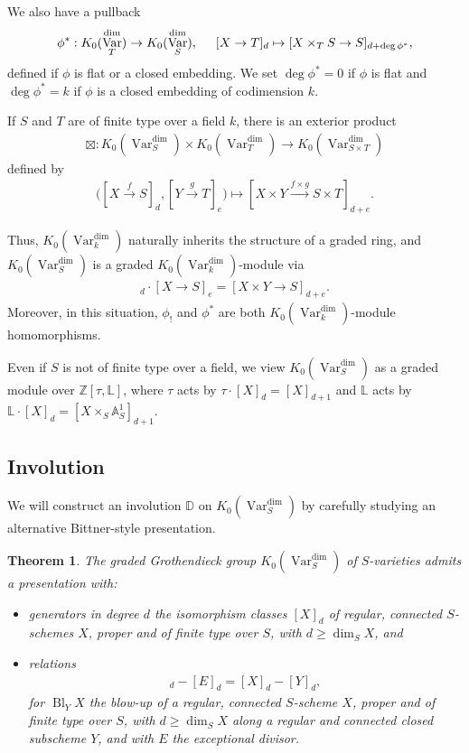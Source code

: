 \documentclass{amsart}
\newtheorem{thm}{Theorem}[section]
\theoremstyle{definition}
\DeclareMathOperator{\Var}{Var}
\DeclareMathOperator{\Bl}{Bl}
\newcommand{\Kdim}{K_0(\Var_k^{\dim})}
\newcommand{\KdimS}{K_0(\Var_S^{\dim})}
\numberwithin{equation}{section}
\begin{document}
We also have a pullback
\begin{align*}
    \phi^*: K_0(\Var_T^{\dim}) \rightarrow K_0(\Var_S^{\dim}), \hspace{.5cm} [X \rightarrow T]_d \mapsto [X \times_T S \rightarrow S]_{d + \deg \phi^*},
\end{align*}
defined if $\phi$ is flat or a closed embedding. We set $\deg \phi^* = 0$ if $\phi$ is flat and $\deg \phi^* = k$ if $\phi$ is a closed embedding of codimension $k$.

If $S$ and $T$ are of finite type over a field $k$, there is an exterior product
\begin{align*}
    \boxtimes: \KdimS \times K_0(\Var_T^{\dim}) \rightarrow K_0(\Var_{S \times T}^{\dim})
\end{align*}
defined by 
\begin{align*}
    \big( [X \xrightarrow[]{f} S]_d, [Y \xrightarrow[]{g} T]_e \big) \mapsto [X \times Y \xrightarrow[]{f \times g} S \times T]_{d+e}.
\end{align*}

Thus, $\Kdim$ naturally inherits the structure of a graded ring, and $\KdimS$ is a graded $\Kdim$-module via
\begin{align*}
    [Y]_d \cdot [X \rightarrow S]_e = [X \times Y \rightarrow S]_{d+e}.
\end{align*}
Moreover, in this situation, $\phi_!$ and $\phi^*$ are both $\Kdim$-module homomorphisms.

Even if $S$ is not of finite type over a field, we view $\KdimS$ as a graded  module over $\mathbb{Z}[\tau, \mathbb{L}]$, where $\tau$ acts by $\tau \cdot [X]_d = [X]_{d+1}$ and $\mathbb{L}$ acts by $\mathbb{L} \cdot [X]_d = [X \times_S \mathbb{A}^1_S]_{d+1}$.



\subsection{Involution}

We will construct an involution $\mathbb{D}$ on $\KdimS$ by carefully studying an alternative Bittner-style presentation.

\begin{thm}\label{bittner presentation}
The graded Grothendieck group $\KdimS$ of $S$-varieties admits a presentation with:
\begin{itemize}
    \item generators in degree $d$ the isomorphism classes $[X]_d$ of regular, connected $S$-schemes $X$, proper and of finite type over $S$, with $d \geq \dim_S X$, and
    \item relations
        \begin{align*}
            [\Bl_Y X]_d - [E]_d = [X]_d - [Y]_d,
        \end{align*}
    for $\Bl_Y X$ the blow-up of a regular, connected $S$-scheme $X$, proper and of finite type over $S$, with $d \geq \dim_S X$ along a regular and connected closed subscheme $Y$, and with $E$ the exceptional divisor.
\end{itemize}
\end{thm}
\end{document}
